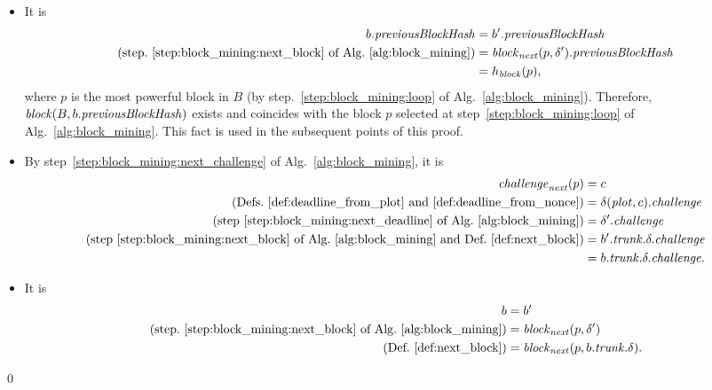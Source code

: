 \begin{itemize}
\begin{itemize}
\begin{align*}
        \text{(Def.~\ref{def:deadline_from_nonce})}&=\mathit{value}(\nonce(\Delta.p,\Delta.\pi),\Delta.\challenge).
      \end{align*}
    \item[\ref{prop:consensus:no_dangling}] It is
      \begin{align*}
        b.{\mathit{previousBlockHash}}&=b'.{\mathit{previousBlockHash}}\\
        \text{(step.~\ref{step:block_mining:next_block} of Alg.~\ref{alg:block_mining})}
        &={\mathit{block}}_{\mathit{next}}(p,\delta').{\mathit{previousBlockHash}}\\
        &=h_{\mathit{block}}(p),
      \end{align*}
      where $p$ is the most powerful block in $B$ (by step.~\ref{step:block_mining:loop}
      of Alg.~\ref{alg:block_mining}). Therefore, ${\mathit{block}}(B,b.{\mathit{previousBlockHash}})$ exists
      and coincides with the block $p$ selected at step~\ref{step:block_mining:loop}
      of Alg.~\ref{alg:block_mining}. This fact is used in the subsequent points of this proof.
    \item[\ref{prop:consensus:answer}] By step~\ref{step:block_mining:next_challenge}
      of Alg.~\ref{alg:block_mining}, it is
      \begin{align*}
        {\mathit{challenge}}_{\mathit{next}}(p)&=c\\
        \text{(Defs.~\ref{def:deadline_from_plot} and~\ref{def:deadline_from_nonce})}&=
        \delta({\mathit{plot}},c).{\mathit{challenge}}\\
        \text{(step~\ref{step:block_mining:next_deadline} of Alg.~\ref{alg:block_mining})}&=\delta'.{\mathit{challenge}}\\
        \text{(step~\ref{step:block_mining:next_block} of Alg.~\ref{alg:block_mining} and Def.~\ref{def:next_block})}&=b'.{\mathit{trunk}}.\delta.{\mathit{challenge}}\\
        &=b.{\mathit{trunk}}.\delta.{\mathit{challenge}}.
      \end{align*}
    \item[\ref{prop:consensus:next_block}] It is
      \begin{align*}
        b&=b'\\
        \text{(step.~\ref{step:block_mining:next_block} of Alg.~\ref{alg:block_mining})}
        &={\mathit{block}}_{\mathit{next}}(p,\delta')\\
        \text{(Def.~\ref{def:next_block})}&={\mathit{block}}_{\mathit{next}}(p,b.{\mathit{trunk}}.\delta).
      \end{align*}
    \end{itemize}
  \end{itemize}
  \qed

